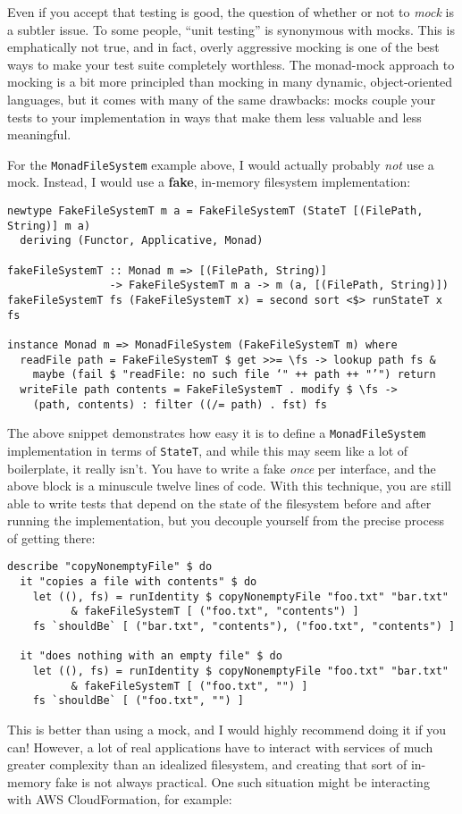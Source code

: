 Even if you accept that testing is good, the question of whether or not
to \emph{mock} is a subtler issue. To some people, ``unit testing'' is
synonymous with mocks. This is emphatically not true, and in fact,
overly aggressive mocking is one of the best ways to make your test
suite completely worthless. The monad-mock approach to mocking is a bit
more principled than mocking in many dynamic, object-oriented languages,
but it comes with many of the same drawbacks: mocks couple your tests to
your implementation in ways that make them less valuable and less
meaningful.

For the \texttt{MonadFileSystem} example above, I would actually
probably \emph{not} use a mock. Instead, I would use a \textbf{fake},
in-memory filesystem implementation:

\begin{verbatim}
newtype FakeFileSystemT m a = FakeFileSystemT (StateT [(FilePath, String)] m a)
  deriving (Functor, Applicative, Monad)

fakeFileSystemT :: Monad m => [(FilePath, String)]
                -> FakeFileSystemT m a -> m (a, [(FilePath, String)])
fakeFileSystemT fs (FakeFileSystemT x) = second sort <$> runStateT x fs

instance Monad m => MonadFileSystem (FakeFileSystemT m) where
  readFile path = FakeFileSystemT $ get >>= \fs -> lookup path fs &
    maybe (fail $ "readFile: no such file ‘" ++ path ++ "’") return
  writeFile path contents = FakeFileSystemT . modify $ \fs ->
    (path, contents) : filter ((/= path) . fst) fs
\end{verbatim}
The above snippet demonstrates how easy it is to define a
\texttt{MonadFileSystem} implementation in terms of \texttt{StateT}, and
while this may seem like a lot of boilerplate, it really isn't. You have
to write a fake \emph{once} per interface, and the above block is a
minuscule twelve lines of code. With this technique, you are still able
to write tests that depend on the state of the filesystem before and
after running the implementation, but you decouple yourself from the
precise process of getting there:

\begin{verbatim}
describe "copyNonemptyFile" $ do
  it "copies a file with contents" $ do
    let ((), fs) = runIdentity $ copyNonemptyFile "foo.txt" "bar.txt"
          & fakeFileSystemT [ ("foo.txt", "contents") ]
    fs `shouldBe` [ ("bar.txt", "contents"), ("foo.txt", "contents") ]

  it "does nothing with an empty file" $ do
    let ((), fs) = runIdentity $ copyNonemptyFile "foo.txt" "bar.txt"
          & fakeFileSystemT [ ("foo.txt", "") ]
    fs `shouldBe` [ ("foo.txt", "") ]
\end{verbatim}
This is better than using a mock, and I would highly recommend doing it
if you can! However, a lot of real applications have to interact with
services of much greater complexity than an idealized filesystem, and
creating that sort of in-memory fake is not always practical. One such
situation might be interacting with AWS CloudFormation, for example:


